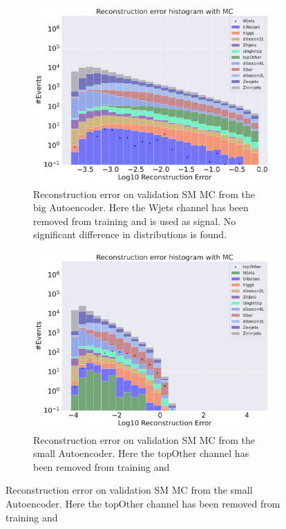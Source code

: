 \begin{figure}[H]
\begin{subfigure}{.45\textwidth}
        \includegraphics[width=\textwidth]{Figures/AE_testing/big/b_data_recon_big_rm3_feats_sig_Wjets.pdf}
        \caption{Reconstruction error on validation SM MC from the big Autoencoder. Here the Wjets channel has been removed from training and 
        is used as signal. No significant difference in distributions is found. }
        \label{fig:ae_big_Wjets}
    \end{subfigure}
    \hfill 
    \begin{subfigure}{.45\textwidth}
        \includegraphics[width=\textwidth]{Figures/AE_testing/small/b_data_recon_big_rm3_feats_sig_topOther.pdf}
        \caption{Reconstruction error on validation SM MC from the small Autoencoder. Here the topOther channel has been removed from training and 
}
\end{subfigure}
\end{figure}
